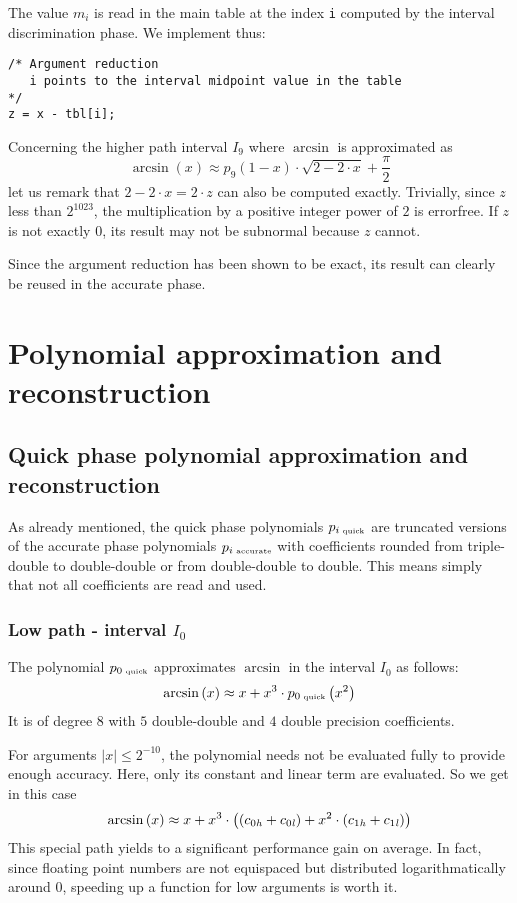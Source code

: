 The value $m_i$ is read in the main table at the index {\tt i}
computed by the interval discrimination phase. We implement thus:
\begin{lstlisting}[caption={Argument reduction},firstnumber=1]
/* Argument reduction 
   i points to the interval midpoint value in the table
*/
z = x - tbl[i];
\end{lstlisting}

Concerning the higher path interval $I_9$ where $\arcsin$ is
approximated as
$$\arcsin\left( x \right) \approx p_9\left( 1 - x \right) \cdot
\sqrt{2 - 2\cdot x} + \frac{\pi}{2}$$ let us remark that $2 - 2\cdot x
= 2 \cdot z$ can also be computed exactly. Trivially, since $z$ less
than $2^{1023}$, the multiplication by a positive integer power of $2$
is errorfree. If $z$ is not exactly $0$, its result may not be
subnormal because $z$ cannot.

Since the argument reduction has been shown to be exact, its result
can clearly be reused in the accurate phase.

\section{Polynomial approximation and reconstruction}\label{sec:asinpolynomial}
\subsection{Quick phase polynomial approximation and reconstruction}\label{subsec:asinquickpolynomial}
As already mentioned, the quick phase polynomials $p_{i\mbox{\tiny ~quick}}$ 
are truncated versions of the accurate phase polynomials
$p_{i\mbox{\tiny ~accurate}}$ with coefficients rounded from
triple-double to double-double or from double-double to double. This
means simply that not all coefficients are read and used.
\subsubsection{Low path - interval $I_0$}
The polynomial $p_{0\mbox{\tiny ~quick}}$ approximates $\arcsin$ in the interval $I_0$ as follows:
$$\arcsin\left( x \right) \approx x + x^3 \cdot p_{0\mbox{\tiny ~quick}}\left( x^2 \right)$$
It is of degree $8$ with $5$ double-double and $4$ double precision
coefficients. 

For arguments $\left \vert x \right \vert \leq 2^{-10}$, the
polynomial needs not be evaluated fully to provide enough accuracy. 
Here, only its constant and linear term are evaluated. So we get in this case
$$\arcsin\left( x \right) \approx x + x^3 \cdot \left( \left( c_{0\mathit{h}} + c_{0\mathit{l}} \right) + 
  x^2 \cdot \left( c_{1\mathit{h}} + c_{1\mathit{l}} \right) \right)$$ This special
path yields to a significant performance gain on average. In fact,
since floating point numbers are not equispaced but distributed
logarithmatically around $0$, speeding up a function for low arguments
is worth it.

